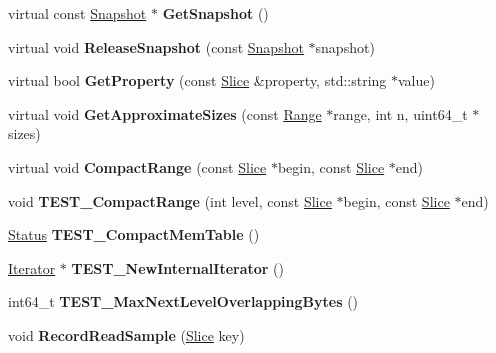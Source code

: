 \begin{DoxyCompactItemize}
\item 
\mbox{\label{classleveldb_1_1_d_b_impl_a4bec3d8ffd65fec562b2dd1f6eaba137}} 
virtual const \mbox{\hyperlink{classleveldb_1_1_snapshot}{Snapshot}} $\ast$ {\bfseries Get\+Snapshot} ()
\item 
\mbox{\label{classleveldb_1_1_d_b_impl_a6c0b6abfc9a30cc8e5412d4fc3e8c886}} 
virtual void {\bfseries Release\+Snapshot} (const \mbox{\hyperlink{classleveldb_1_1_snapshot}{Snapshot}} $\ast$snapshot)
\item 
\mbox{\label{classleveldb_1_1_d_b_impl_ad1a2023ce171c8f8476664f5b1cbab4d}} 
virtual bool {\bfseries Get\+Property} (const \mbox{\hyperlink{classleveldb_1_1_slice}{Slice}} \&property, std\+::string $\ast$value)
\item 
\mbox{\label{classleveldb_1_1_d_b_impl_af08e218d92064699942c195ce0f06010}} 
virtual void {\bfseries Get\+Approximate\+Sizes} (const \mbox{\hyperlink{structleveldb_1_1_range}{Range}} $\ast$range, int n, uint64\+\_\+t $\ast$sizes)
\item 
\mbox{\label{classleveldb_1_1_d_b_impl_aa6df0739fc0b49380c284347e411b8ed}} 
virtual void {\bfseries Compact\+Range} (const \mbox{\hyperlink{classleveldb_1_1_slice}{Slice}} $\ast$begin, const \mbox{\hyperlink{classleveldb_1_1_slice}{Slice}} $\ast$end)
\item 
\mbox{\label{classleveldb_1_1_d_b_impl_a63fcb49466b689a534ba77d32cf84f99}} 
void {\bfseries T\+E\+S\+T\+\_\+\+Compact\+Range} (int level, const \mbox{\hyperlink{classleveldb_1_1_slice}{Slice}} $\ast$begin, const \mbox{\hyperlink{classleveldb_1_1_slice}{Slice}} $\ast$end)
\item 
\mbox{\label{classleveldb_1_1_d_b_impl_a8642703fd1398cd8e3f5f24ee0b9da23}} 
\mbox{\hyperlink{classleveldb_1_1_status}{Status}} {\bfseries T\+E\+S\+T\+\_\+\+Compact\+Mem\+Table} ()
\item 
\mbox{\label{classleveldb_1_1_d_b_impl_adba5bf4252bd94f7db50e62921b7ba53}} 
\mbox{\hyperlink{classleveldb_1_1_iterator}{Iterator}} $\ast$ {\bfseries T\+E\+S\+T\+\_\+\+New\+Internal\+Iterator} ()
\item 
\mbox{\label{classleveldb_1_1_d_b_impl_af621636048b8d3cfaa21238fe26ef0ca}} 
int64\+\_\+t {\bfseries T\+E\+S\+T\+\_\+\+Max\+Next\+Level\+Overlapping\+Bytes} ()
\item 
\mbox{\label{classleveldb_1_1_d_b_impl_a254ae98e3425046c28ed0aa6d78b37d8}} 
void {\bfseries Record\+Read\+Sample} (\mbox{\hyperlink{classleveldb_1_1_slice}{Slice}} key)
\end{DoxyCompactItemize}
